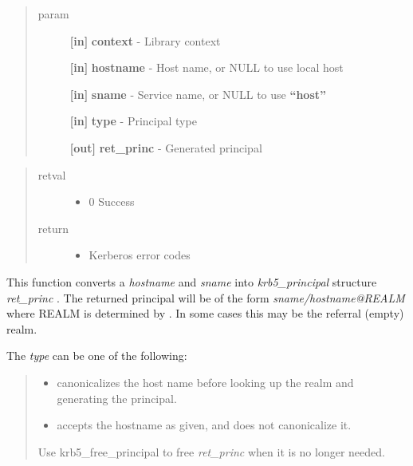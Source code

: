 \documentclass[letterpaper,10pt,english]{sphinxmanual}
\begin{document}
\begin{quote}\begin{description}
\item[{param}] \leavevmode
\textbf{{[}in{]}} \textbf{context} - Library context

\textbf{{[}in{]}} \textbf{hostname} - Host name, or NULL to use local host

\textbf{{[}in{]}} \textbf{sname} - Service name, or NULL to use \textbf{``host''}

\textbf{{[}in{]}} \textbf{type} - Principal type

\textbf{{[}out{]}} \textbf{ret\_princ} - Generated principal

\end{description}\end{quote}
\begin{quote}\begin{description}
\item[{retval}] \leavevmode\begin{itemize}
\item {} 
0   Success

\end{itemize}

\item[{return}] \leavevmode\begin{itemize}
\item {} 
Kerberos error codes

\end{itemize}

\end{description}\end{quote}

This function converts a \emph{hostname} and \emph{sname} into \emph{krb5\_principal} structure \emph{ret\_princ} . The returned principal will be of the form \emph{sname/hostname@REALM} where REALM is determined by {\hyperref[appdev/refs/api/krb5_get_host_realm:krb5_get_host_realm]{}} . In some cases this may be the referral (empty) realm.

The \emph{type} can be one of the following:
\begin{quote}
\begin{itemize}
\item {} 
{\hyperref[appdev/refs/macros/KRB5_NT_SRV_HST:KRB5_NT_SRV_HST]{}} canonicalizes the host name before looking up the realm and generating the principal.

\item {} 
{\hyperref[appdev/refs/macros/KRB5_NT_UNKNOWN:KRB5_NT_UNKNOWN]{}} accepts the hostname as given, and does not canonicalize it.

\end{itemize}

Use krb5\_free\_principal to free \emph{ret\_princ} when it is no longer needed.
\end{quote}
\end{document}
